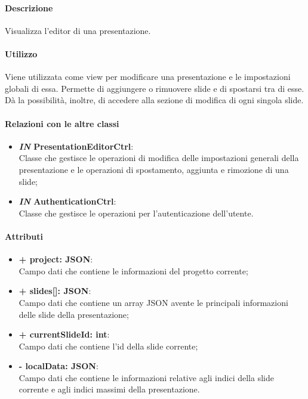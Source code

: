 	\paragraph{Descrizione}
	Visualizza l'editor di una presentazione.
	
	\paragraph{Utilizzo}
	Viene utilizzata come view per modificare una presentazione e le impostazioni globali di essa. Permette di aggiungere o rimuovere slide e di spostarsi tra di esse. Dà la possibilità, inoltre, di accedere alla sezione di modifica di ogni singola slide.
	
	\paragraph{Relazioni con le altre classi}
	\begin{itemize}
		\item \textbf{\textit{IN} PresentationEditorCtrl}:\\
		Classe che gestisce le operazioni di modifica delle impostazioni generali della presentazione e le operazioni di spostamento, aggiunta e rimozione di una slide;
		\item \textbf{\textit{IN} AuthenticationCtrl}:\\
		Classe che gestisce le operazioni per l'autenticazione dell'utente.
	\end{itemize}
	
	\paragraph{Attributi}
	\begin{itemize}
		\item \textbf{+ project: JSON}:\\
		Campo dati che contiene le informazioni del progetto corrente;
		\item \textbf{+ slides[]: JSON}:\\
		Campo dati che contiene un array JSON avente le principali informazioni delle slide della presentazione;
		\item \textbf{+ currentSlideId: int}:\\
		Campo dati che contiene l'id della slide corrente;
		\item \textbf{- localData: JSON}:\\
		Campo dati che contiene le informazioni relative agli indici della slide corrente e agli indici massimi della presentazione.
	\end{itemize}
\newpage
	
